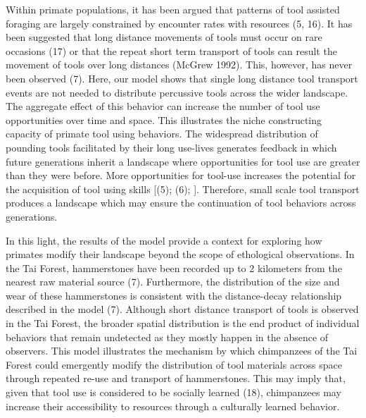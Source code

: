 \documentclass[9pt,twocolumn,twoside,]{pnas-new}
\begin{document}
Within primate populations, it has been argued that patterns of tool
assisted foraging are largely constrained by encounter rates with
resources (5, 16). It has been suggested that long distance movements of
tools must occur on rare occasions (17) or that the repeat short term
transport of tools can result the movement of tools over long distances
(McGrew 1992). This, however, has never been observed (7). Here, our
model shows that single long distance tool transport events are not
needed to distribute percussive tools across the wider landscape. The
aggregate effect of this behavior can increase the number of tool use
opportunities over time and space. This illustrates the niche
constructing capacity of primate tool using behaviors. The widespread
distribution of pounding tools facilitated by their long use-lives
generates feedback in which future generations inherit a landscape where
opportunities for tool use are greater than they were before. More
opportunities for tool-use increases the potential for the acquisition
of tool using skills {[}(5); (6); {]}. Therefore, small scale tool
transport produces a landscape which may ensure the continuation of tool
behaviors across generations.

In this light, the results of the model provide a context for exploring
how primates modify their landscape beyond the scope of ethological
observations. In the Tai Forest, hammerstones have been recorded up to 2
kilometers from the nearest raw material source (7). Furthermore, the
distribution of the size and wear of these hammerstones is consistent
with the distance-decay relationship described in the model (7).
Although short distance transport of tools is observed in the Tai
Forest, the broader spatial distribution is the end product of
individual behaviors that remain undetected as they mostly happen in the
absence of observers. This model illustrates the mechanism by which
chimpanzees of the Tai Forest could emergently modify the distribution
of tool materials across space through repeated re-use and transport of
hammerstones. This may imply that, given that tool use is considered to
be socially learned (18), chimpanzees may increase their accessibility
to resources through a culturally learned behavior.
\end{document}
